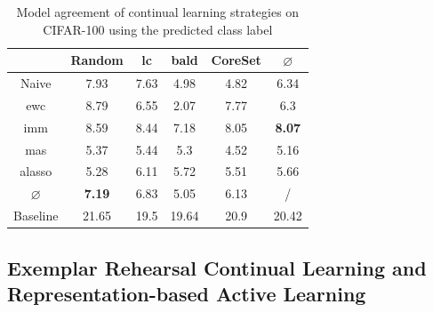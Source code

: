 \begin{table}[h]
    \centering
    \begin{tabular}{ c | c c c c | c } 
         & Random & \gls{lc} & \gls{bald} & CoreSet & $\varnothing$\\ 
        \hline
        Naive & 7.93 & 7.63 & 4.98 & 4.82 & 6.34\\
        \gls{ewc} & 8.79 & 6.55 & 2.07 & 7.77 & 6.3\\
        \gls{imm} & 8.59 & 8.44 & 7.18 & 8.05 & \textbf{8.07}\\
        \gls{mas} & 5.37 & 5.44 & 5.3 & 4.52 & 5.16\\
        \gls{alasso} & 5.28 & 6.11 & 5.72 & 5.51 & 5.66\\
        \hline
        $\varnothing$ & \textbf{7.19} & 6.83 & 5.05 & 6.13 & /\\
        Baseline & 21.65 & 19.5 & 19.64 & 20.9 & 20.42\\
    \end{tabular}
    \caption{Model agreement of continual learning strategies on CIFAR-100 using the predicted class label}
    \label{fig:ModelStealingCIFAR100Label}
\end{table}

\subsection{Exemplar Rehearsal Continual Learning and Representation-based Active Learning}
\label{sec:Evaluation:CALMS:VAAL_AGEM}

